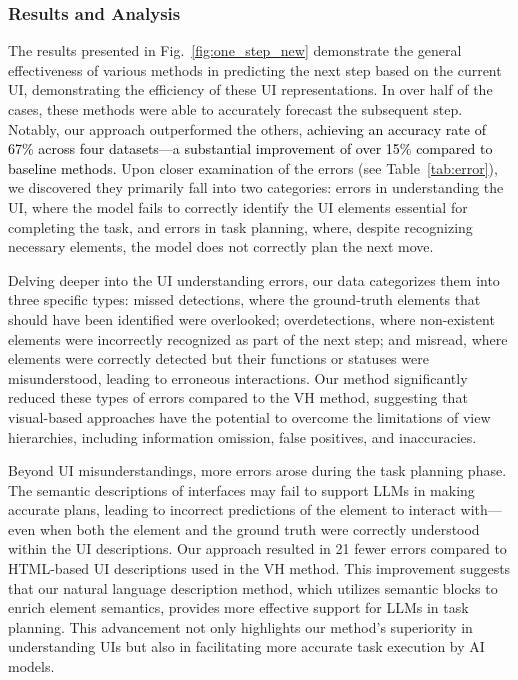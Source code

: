 \subsubsection{Results and Analysis}
The results presented in Fig.~\ref{fig:one_step_new} demonstrate the general effectiveness of various methods in predicting the next step based on the current UI, demonstrating the efficiency of these UI representations. In over half of the cases, these methods were able to accurately forecast the subsequent step. Notably, our approach outperformed the others, \textcolor{black}{achieving an accuracy rate of 67\% across four datasets—a substantial improvement of over 15\% compared to baseline methods.} Upon closer examination of the errors (see Table~\ref{tab:error}), we discovered they primarily fall into two categories: errors in understanding the UI, where the model fails to correctly identify the UI elements essential for completing the task, and errors in task planning, where, despite recognizing necessary elements, the model does not correctly plan the next move.

Delving deeper into the UI understanding errors, our data categorizes them into three specific types: missed detections, where the ground-truth elements that should have been identified were overlooked; overdetections, where non-existent elements were incorrectly recognized as part of the next step; and misread, where elements were correctly detected but their functions or statuses were misunderstood, leading to erroneous interactions. Our method significantly reduced these types of errors compared to the VH method, suggesting that visual-based approaches have the potential to overcome the limitations of view hierarchies, including information omission, false positives, and inaccuracies.

Beyond UI misunderstandings, more errors arose during the task planning phase. The semantic descriptions of interfaces may fail to support LLMs in making accurate plans, leading to incorrect predictions of the element to interact with—even when both the element and the ground truth were correctly understood within the UI descriptions. Our approach resulted in 21 fewer errors compared to HTML-based UI descriptions used in the VH method. This improvement suggests that our natural language description method, which utilizes semantic blocks to enrich element semantics, provides more effective support for LLMs in task planning. This advancement not only highlights our method's superiority in understanding UIs but also in facilitating more accurate task execution by AI models.

